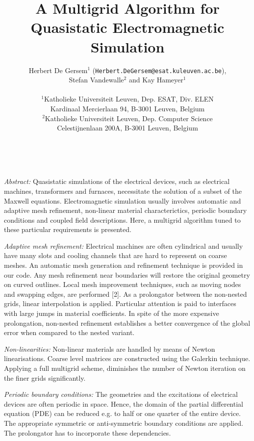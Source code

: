 \documentclass[11pt]{article}
\date{ ~ \hspace{-4mm}}
\title{{\bf  A Multigrid Algorithm for Quasistatic Electromagnetic Simulation }  }
\author{Herbert De Gersem$^1$ ({\tt Herbert.DeGersem@esat.kuleuven.ac.be}), \\ Stefan Vandewalle$^2$ and Kay Hameyer$^1$ \\ \\ $^1$Katholieke Universiteit Leuven, Dep. ESAT, Div. ELEN  \\  Kardinaal Mercierlaan 94, B-3001 Leuven, Belgium  \\  $^2$Katholieke Universiteit Leuven, Dep. Computer Science  \\  Celestijnenlaan 200A, B-3001 Leuven, Belgium}
\begin{document}
\maketitle
\thispagestyle{empty}





 



{\em 
Abstract:
}
 \newline 
Quasistatic simulations of the electrical devices, such as electrical machines, transformers and furnaces, necessitate the solution of a subset of the Maxwell equations. Electromagnetic simulation usually involves automatic and adaptive mesh refinement, non-linear material characterictics, periodic boundary conditions and coupled field descriptions. Here, a multigrid algorithm tuned to these particular requirements is presented.
 \newline 




{\em 
Adaptive mesh refinement:
}
 \newline 
Electrical machines are often cylindrical and usually have many slots and cooling channels that are hard to represent on coarse meshes. An automatic mesh generation and refinement technique is provided in our code. Any mesh refinement near boundaries will restore the original geometry on curved outlines. Local mesh improvement techniques, such as moving nodes and swapping edges, are performed [2]. As a prolongator between the non-nested grids, linear interpolation is applied. Particular attention is paid to interfaces with large jumps in material coefficients. In spite of the more expensive prolongation, non-nested refinement establishes a better convergence of the global error when compared to the nested variant.
 \newline 




{\em 
Non-linearities:
}
 \newline 
Non-linear materials are handled by means of Newton linearisations. Coarse level matrices are constructed using the Galerkin technique. Applying a full multigrid scheme, diminishes the number of Newton iteration on the finer grids significantly.
 \newline 




{\em 
Periodic boundary conditions:
}
 \newline 
The geometries and the excitations of electrical devices are often periodic in space. Hence, the domain of the partial differential equation (PDE) can be reduced e.g. to half or one quarter of the entire device. The appropriate symmetric or anti-symmetric boundary conditions are applied. The prolongator has to incorporate these dependencies.
 \newline 
\end{document}
